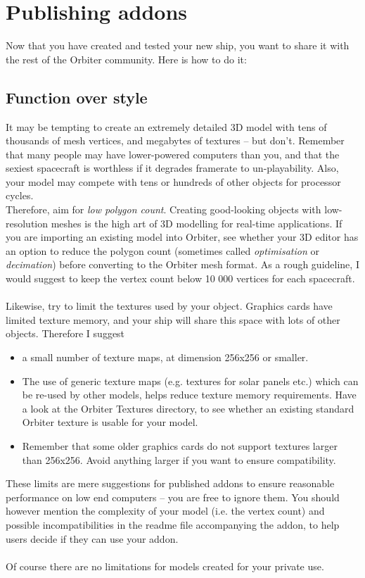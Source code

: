 \documentclass[Orbiter Developer Manual.tex]{subfiles}
\begin{document}
\section{Publishing addons}
Now that you have created and tested your new ship, you want to share it with the rest of the Orbiter community. Here is how to do it:

\subsection{Function over style}
It may be tempting to create an extremely detailed 3D model with tens of thousands of mesh vertices, and megabytes of textures – but don’t. Remember that many people may have lower-powered computers than you, and that the sexiest spacecraft is worthless if it degrades framerate to un-playability. Also, your model may compete with tens or hundreds of other objects for processor cycles.\\
Therefore, aim for \textit{low polygon count}. Creating good-looking objects with low-resolution meshes is the high art of 3D modelling for real-time applications. If you are importing an existing model into Orbiter, see whether your 3D editor has an option to reduce the polygon count (sometimes called \textit{optimisation} or \textit{decimation}) before converting to the Orbiter mesh format. As a rough guideline, I would suggest to keep the vertex count below 10 000 vertices for each spacecraft.\\
\\
Likewise, try to limit the textures used by your object. Graphics cards have limited texture memory, and your ship will share this space with lots of other objects. Therefore I suggest

\begin{itemize}
\item a small number of texture maps, at dimension 256x256 or smaller.
\item The use of generic texture maps (e.g. textures for solar panels etc.) which can be re-used by other models, helps reduce texture memory requirements. Have a look at the Orbiter Textures directory, to see whether an existing standard Orbiter texture is usable for your model.
\item Remember that some older graphics cards do not support textures larger than 256x256. Avoid anything larger if you want to ensure compatibility.
\end{itemize}

\noindent
These limits are mere suggestions for published addons to ensure reasonable performance on low end computers – you are free to ignore them. You should however mention the complexity of your model (i.e. the vertex count) and possible incompatibilities in the readme file accompanying the addon, to help users decide if they can use your addon.\\
\\
Of course there are no limitations for models created for your private use.
\end{document}
